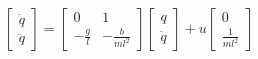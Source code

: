 \documentclass[preview]{standalone}
\begin{document}
\begin{align*}
\begin{bmatrix}\dot{q} \\ \ddot{q}\end{bmatrix} = \begin{bmatrix}0 & 1\\ -\frac{g}{l} & -\frac{b}{ml^2}\end{bmatrix} \begin{bmatrix}q \\ \dot{q}\end{bmatrix} + u\begin{bmatrix}0 \\ \frac{1}{ml^2}\end{bmatrix}
\end{align*}
\end{document}
